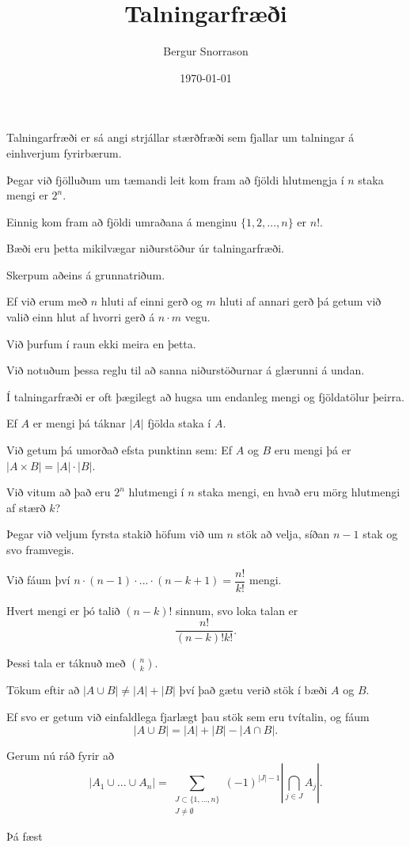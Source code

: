 \title{Talningarfræði}
\author{Bergur Snorrason}
\date{\today}



\frame{\titlepage}

{
	{
		\item<1-> Talningarfræði er sá angi strjállar stærðfræði sem fjallar um talningar á einhverjum fyrirbærum.
		\item<2-> Þegar við fjölluðum um tæmandi leit kom fram að fjöldi hlutmengja í $n$ staka mengi er $2^n$.
		\item<3-> Einnig kom fram að fjöldi umraðana á menginu $\{1, 2, ..., n\}$ er $n!$.
		\item<4-> Bæði eru þetta mikilvægar niðurstöður úr talningarfræði.
		\item<5-> Skerpum aðeins á grunnatriðum.
	}
}

{
	{
		\item<1-> Ef við erum með $n$ hluti af einni gerð og $m$ hluti af annari gerð þá getum við valið einn hlut af hvorri gerð á $n \cdot m$ vegu.
		\item<2-> Við þurfum í raun ekki meira en þetta.
		\item<3-> Við notuðum þessa reglu til að sanna niðurstöðurnar á glærunni á undan.
		\item<4-> Í talningarfræði er oft þægilegt að hugsa um endanleg mengi og fjöldatölur þeirra.
		\item<5-> Ef $A$ er mengi þá táknar $|A|$ fjölda staka í $A$.
		\item<6-> Við getum þá umorðað efsta punktinn sem: Ef $A$ og $B$ eru mengi þá er $|A \times B| = |A| \cdot |B|$.
	}
}

{
	{
		\item<1-> Við vitum að það eru $2^n$ hlutmengi í $n$ staka mengi, en hvað eru mörg hlutmengi af stærð $k$?
		\item<2-> Þegar við veljum fyrsta stakið höfum við um $n$ stök að velja, síðan $n - 1$ stak og svo framvegis.
		\item<3-> Við fáum því $n \cdot (n - 1) \cdot ... \cdot (n - k + 1) = \dfrac{n!}{k!}$ mengi.
		\item<4-> Hvert mengi er þó talið $(n - k)!$ sinnum, svo loka talan er
		\[
			\frac{n!}{(n - k)!k!}.
		\]
		\item<5-> Þessi tala er táknuð með ${n \choose k}$.
	}
}

{
	{
		\item<1-> Tökum eftir að $|A \cup B| \neq |A| + |B|$ því það gætu verið stök í bæði $A$ og $B$.
		\item<2-> Ef svo er getum við einfaldlega fjarlægt þau stök sem eru tvítalin, og fáum
		\[
			|A \cup B| = |A| + |B| - |A \cap B|.
		\]
		\item<3-> Gerum nú ráð fyrir að
		\[
			|A_1 \cup ... \cup A_n| = \sum_{\substack{J \subset \{1, ..., n\} \\ J \neq \emptyset}} (-1)^{|J| - 1} \left | \bigcap_{j \in J} A_j \right |.
		\]
		\item<4-> Þá fæst
	}
}

